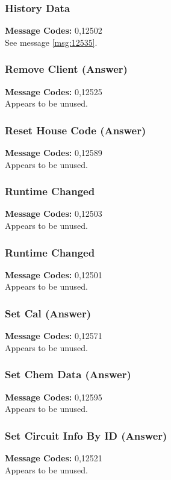 \documentclass[11pt]{article}
\begin{document}
\subsubsection{History Data}
\label{msg:12502}
{\bf Message Codes: } 0,12502\\
See message \ref{msg:12535}.

\subsubsection{Remove Client (Answer)}
\label{msg:12525}
{\bf Message Codes: } 0,12525\\
Appears to be unused.

\subsubsection{Reset House Code (Answer)}
\label{msg:12589}
{\bf Message Codes: } 0,12589\\
Appears to be unused.

\subsubsection{Runtime Changed}
\label{msg:12503}
{\bf Message Codes: } 0,12503\\
Appears to be unused.


\subsubsection{Runtime Changed}
\label{msg:12501}
{\bf Message Codes: } 0,12501\\
Appears to be unused.


\subsubsection{Set Cal (Answer)}
\label{msg:12571}
{\bf Message Codes: } 0,12571\\
Appears to be unused.

\subsubsection{Set Chem Data (Answer)}
\label{msg:12595}
{\bf Message Codes: } 0,12595\\
Appears to be unused.

\subsubsection{Set Circuit Info By ID (Answer)}
\label{msg:12521}
{\bf Message Codes: } 0,12521\\
Appears to be unused.
\end{document}
